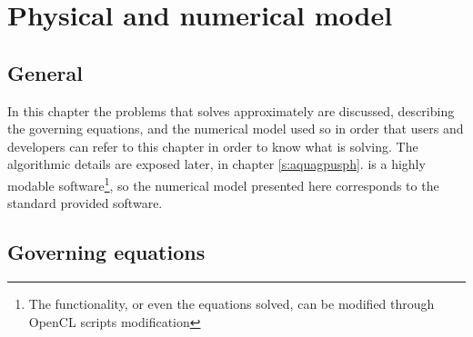 \chapter{Physical and numerical model}
\label{s:model}
%
\section{General}
%
In this chapter the problems that \NAME solves approximately are discussed, describing
the governing equations, and the numerical model used so in order that users
and developers can refer to this chapter in order to know what \NAME is solving.\rc
%
The algorithmic details are exposed later, in chapter \ref{s:aquagpusph}.\rc
%
\NAME is a highly modable software\footnote{The functionality, or even the equations solved,
can be modified through OpenCL scripts modification}, so the numerical model presented here
corresponds to the standard provided software.
%
\section{Governing equations}
\label{ss:governing_equations}
%

